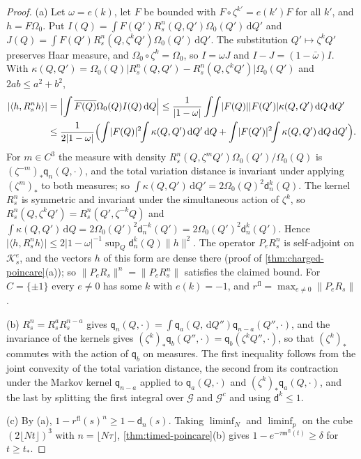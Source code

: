\documentclass[11pt,a4paper]{amsart}
\theoremstyle{definition}
\theoremstyle{remark}
\numberwithin{equation}{section}
\newcommand{\Kspace}{\mathcal{K}}    %
\newcommand{\ip}[2]{\langle #1,#2\rangle}  %
\newcommand{\norm}[1]{\lVert #1\rVert}     %
\newcommand{\abs}[1]{\lvert #1\rvert}      %
\newcommand{\dd}{\,\mathrm{d}}             %
\newcommand{\cube}[1]{(2#1)^3}             %
\newcommand{\Omegazero}{\Omega_0}          %
\begin{document}
\begin{proof}
(a) Let $\omega=e(k)$, let $F$ be bounded with $F\circ\zeta^{k'}=e(k')F$ for all $k'$, and $h=F\Omegazero$. Put $I(Q)=\int F(Q')R_s^n(Q,Q')\Omegazero(Q')\dd Q'$ and $J(Q)=\int F(Q')R_s^n(Q,\zeta^kQ')\Omegazero(Q')\dd Q'$. The substitution $Q'\mapsto\zeta^kQ'$ preserves Haar measure, and $\Omegazero\circ\zeta^k=\Omegazero$, so $I=\omega J$ and $I-J=(1-\bar\omega)I$. With $\kappa(Q,Q')=\Omegazero(Q)\abs{R_s^n(Q,Q')-R_s^n(Q,\zeta^kQ')}\Omegazero(Q')$ and $2ab\le a^2+b^2$,
\begin{align*}
\abs{\ip h{R_s^nh}}&=\Bigl\lvert\int\overline{F(Q)}\Omegazero(Q)I(Q)\dd Q\Bigr\rvert\le\frac1{\abs{1-\omega}}\int\!\!\int\abs{F(Q)}\abs{F(Q')}\kappa(Q,Q')\dd Q\dd Q'\\
&\le\frac1{2\abs{1-\omega}}\Bigl(\int\abs{F(Q)}^2\!\!\int\kappa(Q,Q')\dd Q'\dd Q+\int\abs{F(Q')}^2\!\!\int\kappa(Q,Q')\dd Q\dd Q'\Bigr).
\end{align*}
For $m\in C^3$ the measure with density $R_s^n(Q,\zeta^mQ')\Omegazero(Q')/\Omegazero(Q)$ is $(\zeta^{-m})_*\mathsf q_n(Q,\cdot)$, and the total variation distance is invariant under applying $(\zeta^m)_*$ to both measures; so $\int\kappa(Q,Q')\dd Q'=2\Omegazero(Q)^2\mathsf d^k_n(Q)$. The kernel $R_s^n$ is symmetric and invariant under the simultaneous action of $\zeta^k$, so $R_s^n(Q,\zeta^kQ')=R_s^n(Q',\zeta^{-k}Q)$ and $\int\kappa(Q,Q')\dd Q=2\Omegazero(Q')^2\mathsf d^{-k}_n(Q')=2\Omegazero(Q')^2\mathsf d^k_n(Q')$. Hence $\abs{\ip h{R_s^nh}}\le2\abs{1-\omega}^{-1}\sup_Q\mathsf d^k_n(Q)\norm h^2$. The operator $P_eR_s^n$ is self-adjoint on $\Kspace^e_s$, and the vectors $h$ of this form are dense there (proof of \cref{thm:charged-poincare}(a)); so $\norm{P_eR_s}^n=\norm{P_eR_s^n}$ satisfies the claimed bound. For $C=\{\pm1\}$ every $e\ne0$ has some $k$ with $e(k)=-1$, and $r^{\mathrm{fl}}=\max_{e\ne0}\norm{P_eR_s}$.

(b) $R_s^n=R_s^aR_s^{n-a}$ gives $\mathsf q_n(Q,\cdot)=\int\mathsf q_a(Q,\dd Q'')\mathsf q_{n-a}(Q'',\cdot)$, and the invariance of the kernels gives $(\zeta^k)_*\mathsf q_b(Q'',\cdot)=\mathsf q_b(\zeta^kQ'',\cdot)$, so that $(\zeta^k)_*$ commutes with the action of $\mathsf q_b$ on measures. The first inequality follows from the joint convexity of the total variation distance, the second from its contraction under the Markov kernel $\mathsf q_{n-a}$ applied to $\mathsf q_a(Q,\cdot)$ and $(\zeta^k)_*\mathsf q_a(Q,\cdot)$, and the last by splitting the first integral over $\mathcal G$ and $\mathcal G^c$ and using $\mathsf d^k\le1$.

(c) By (a), $1-r^{\mathrm{fl}}(s)^n\ge1-\mathsf d_n(s)$. Taking $\liminf_N$ and $\liminf_p$ on the cube $\cube{\lfloor Nt\rfloor}$ with $n=\lfloor N\tau\rfloor$, \cref{thm:timed-poincare}(b) gives $1-e^{-\tau\mathsf m^{\mathrm{fl}}(t)}\ge\delta$ for $t\ge t_*$.
\end{proof}
\end{document}
